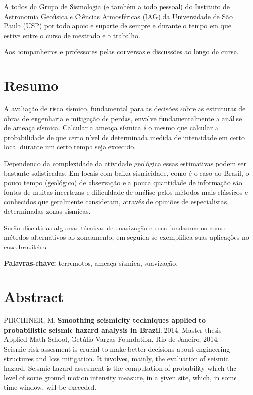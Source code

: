 \documentclass[12pt,twoside,a4paper]{book}
\numberwithin{equation}{section}
\begin{document}
A todos do Grupo de Sismologia (e também a todo pessoal) do Instituto de
Astronomia Geofísica e Ciências Atmosféricas (IAG) da Universidade de São Paulo (USP) 
por todo apoio e suporte de sempre e durante o tempo em que
estive entre o curso de mestrado e o trabalho.

Aos companheiros e professores pelas conversas e discussões ao longo do curso.

\chapter*{Resumo}

A avaliação de risco sísmico, fundamental para as decisões sobre as estruturas de obras de engenharia
e mitigação de perdas, envolve fundamentalmente a análise de ameaça sísmica. 
Calcular a ameaça sísmica é o mesmo que calcular a probabilidade de que certo nível de 
determinada medida de intensidade em certo local durante um certo tempo seja excedido.

Dependendo da complexidade da atividade geológica essas estimativas podem ser bastante sofisticadas.
Em locais com baixa sismicidade, como é o caso do Brasil, o pouco tempo (geológico) de observação
e a pouca quantidade de informação são fontes de muitas incertezas e dificuldade de análise pelos métodos mais clássicos
e conhecidos que geralmente consideram, através de opiniões de especialistas, determinadas zonas sísmicas.

Serão discutidas algumas técnicas de suavização e seus fundamentos como métodos alternativos ao zoneamento,
em seguida se exemplifica suas aplicações no caso brasileiro.

\noindent \textbf{Palavras-chave:} terremotos, ameaça sísmica, suavização.

\chapter*{Abstract}
\noindent PIRCHINER, M. \textbf{Smoothing seismicity techniques applied to probabilistic seismic
hazard analysis in Brazil}.
2014.
Master thesis - Applied Math School,
Getúlio Vargas Foundation, Rio de Janeiro, 2014.
\\

Seismic risk assesment is crucial to make better decisions about engineering structures and loss mitigation.
It involves, mainly, the evaluation of seismic hazard.
Seismic hazard assesment is the computation of probability which the level of some ground
motion intensity measure, in a given site, which, in some time window, will be exceeded.
\end{document}
